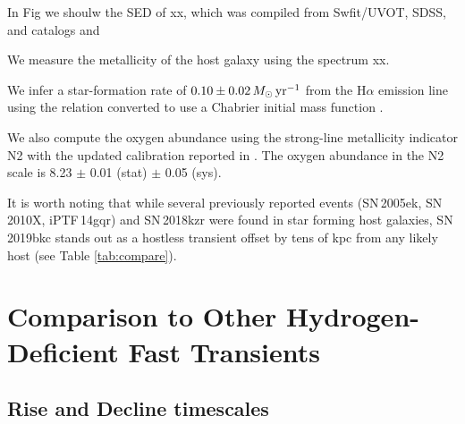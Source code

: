 \documentclass[twocolumn]{aastex63}
\begin{document}
\begin{CJK*}{UTF8}{gbsn}
In Fig we shoulw the SED of xx, which was compiled from Swfit/UVOT, SDSS, and catalogs and 

We measure the metallicity of the host galaxy using  the spectrum xx. 

We infer a star-formation rate of $0.10 \pm 0.02 \, M_\odot\, {\rm yr^{-1}}$ from the H$\alpha$ 
emission line using the \citet{Kennicutt1998} relation converted to use a Chabrier initial mass function 
\citep{Chabrier2003, Madau2014}. 

We also compute the oxygen abundance using the strong-line metallicity indicator N2 
\citep{Pettini2004} with the updated calibration reported in \citet{Marino2013}. The oxygen abundance 
in the N2 scale is 8.23 $\pm$ 0.01 (stat) $\pm$ 0.05 (sys).

It is worth noting that while several 
previously reported events (SN\,2005ek, SN\,2010X, iPTF\,14gqr) and SN\,2018kzr were found in star 
forming host galaxies, SN\,2019bkc stands out as a hostless transient offset by tens of kpc from any 
likely host (see Table \ref{tab:compare}). 

\section{Comparison to Other Hydrogen-Deficient Fast Transients}
\subsection{Rise and Decline timescales}


\end{CJK*}
\end{document}
